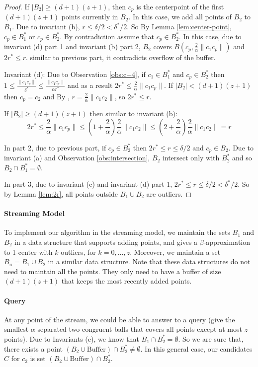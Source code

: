 \documentclass[envcountsame]{cls/cccg15}
\newcommand{\dz}{(d + 1)(z + 1)}
\newcommand{\Buffer}{\ensuremath{\text{Buffer}}}
\newcommand{\len}[1]{\|{#1}\|}
\newcommand{\radius}[1]{\frac{2}{\alpha} \len{c_1 #1}}
\newcommand{\lee}{\leqslant}
\newcommand{\gee}{\geqslant}
\renewcommand{\leq}{\lee}
\renewcommand{\geq}{\gee}
\renewcommand{\ge}{\gee}
\begin{document}
\begin{proof}
If $|B_2| \geq \dz$, then $c_p$ is the centerpoint of the first $\dz$ points currently in $B_2$. 
In this case, we add all points of $B_2$ to $B_1$. Due to invariant (b), $r \leq \delta/2 < \delta^*/2$. 
So By Lemma \ref{lem:center-point}, $c_p \in B_1^*$ or $c_p \in B_2^*$. By contradiction assume that $c_p \in B_2^*$. In this case, due to invariant (d) part 1 and invariant (b) part 2, $B_2$ covers $B(c_p, \radius{c_p})$ and $2r^* \leq r$. similar to previous part, it contradicts overflow of the buffer. 

Invariant (d): 
Due to  Observation \ref{obs:c+4}, if $c_1 \in B_1^*$ and $c_p \in B_2^*$ then $1 \leq \frac{\len{c_1 c_p}}{\delta^*} \leq \frac{\len{c_1 c_p}}{\alpha r^*}$ and as a result $2r^* \leq \radius{c_p}$. If $|B_2| < \dz$ then $c_p = c_2$ and By , $r = \radius{c_2}$, so $2r^* \leq r$.

If $|B_2| \ge \dz$ then similar to invariant (b): $$2r^* \leq \radius{c_p} \leq (1 + \frac{2}{\alpha})\radius{c_2} \leq (2 + \frac{2}{\alpha})\radius{c_2} = r$$

In part 2, due to previous part, if $c_p \in B_2^*$ then $2r^* \leq r \leq \delta /2$ and $c_p \in B_2$. Due to invariant (a) and Observation \ref{obs:intersection}, $B_2$ intersect only with $B_2^*$ and so $B_2 \cap B_1^* = \emptyset$.

In part 3, due to invariant (c) and invariant (d) part 1, $2r^* \leq r \leq \delta/2 < \delta^* /2$. So by Lemma \ref{lem:2r}, all points outside $B_1 \cup B_2$ are outliers.

\end{proof}

\paragraph{Streaming Model}
To implement our algorithm in the streaming model,
we maintain the sets $B_1$ and $B_2$ 
in a data structure that supports adding points,
and gives a $\beta$-approximation to 1-center with $k$ outliers, for $k=0,\dots,z$.
Moreover, we maintain a set $B_u = B_1 \cup B_2$ in a similar data structure.
Note that these data structures do not need to maintain all the points. 
They only need to have a buffer of size $\dz$ that keeps the most recently added points.

\paragraph{Query}
At any point of the stream, we could be able to answer to a query (give the smallest $\alpha$-separated two congruent balls that covers all points except at most $z$ points).
Due to Invariants (c), we know that $B_1 \cap B_2^* = \emptyset$. 
So we are sure that, there exists a point $(B_2 \cup \Buffer) \cap B_2^* \neq \emptyset$.
In this general case, our candidates $C$ for $c_2$ is set $(B_2 \cup \Buffer) \cap B_2^*$.
\end{document}

